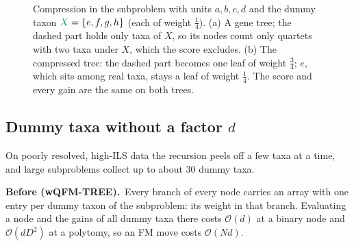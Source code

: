 \documentclass[11pt,a4paper]{article}
\newcommand{\wqfmtree}{wQFM-TREE}
\newcommand{\Oh}{\mathcal{O}}
\newcommand{\Before}{\par\smallskip\noindent\textbf{\textcolor{beforec}{Before (\wqfmtree).}}\ }
\begin{document}
\begin{figure}[t]
\caption{Compression in the subproblem with units $a,b,c,d$ and the dummy taxon
$\textcolor{Xc}{X}=\{e,f,g,h\}$ (each of weight $\tfrac14$). (a) A gene tree; the dashed part holds
only taxa of $X$, so its nodes count only quartets with two taxa under $X$, which the score excludes.
(b) The compressed tree: the dashed part becomes one leaf of weight $\tfrac34$; $e$, which sits
among real taxa, stays a leaf of weight $\tfrac14$. The score and every gain are the same on both
trees.}
\label{fig:compress}
\end{figure}

\subsection{Dummy taxa without a factor $d$}\label{sec:dummies}

On poorly resolved, high-ILS data the recursion peels off a few taxa at a time, and large
subproblems collect up to about 30 dummy taxa.

\Before Every branch of every node carries an array with one entry per dummy taxon of the
subproblem: its weight in that branch. Evaluating a node and the gains of all dummy taxa there
costs $\Oh(d)$ at a binary node and $\Oh(dD^2)$ at a polytomy, so an FM move costs $\Oh(Nd)$.
\end{document}
